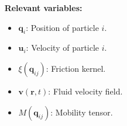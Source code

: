 \documentclass{beamer}
\newcommand{\ppos}{q}
\newcommand{\pvel}{u}
\newcommand{\fpos}{r}
\newcommand{\fvel}{v}
\renewcommand{\vec}[1]{\bm{#1}}
\newcommand{\tens}[1]{\bm{\mathcal{#1}}}
\newcommand{\kT}{k_B T}
\newcommand{\noise}{\widetilde{W}}
\begin{document}
\begin{frame}
\begin{columns}
\begin{column}{0.5\linewidth}
    \end{column}
    \begin{column}{0.45\linewidth}
      \begin{center}
        \textbf{Relevant variables:}
      \end{center}
      \begin{itemize}
      \item<1-> $\vec{q}_i$: Position of particle $i$.
      \item<1-> $\vec{u}_i$: Velocity of particle $i$.
      \item<2,5-> $\xi(\vec{q}_{ij})$: Friction kernel.
      \item<3,5-> $\vec{v}(\vec{r},t)$: Fluid velocity field.
      \item<4-> $M(\vec{q}_{ij})$: Mobility tensor.

\end{itemize}
\end{column}
\end{columns}
\end{frame}
\end{document}
